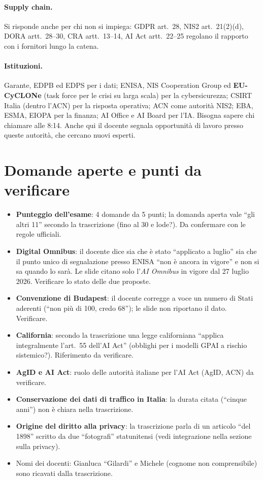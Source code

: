 \paragraph{Supply chain.} Si risponde anche per chi non si impiega: GDPR art.~28, NIS2
art.~21(2)(d), DORA artt.~28--30, CRA artt.~13--14, AI Act artt.~22--25 regolano il rapporto con i
fornitori lungo la catena.

\paragraph{Istituzioni.} Garante, EDPB ed EDPS per i dati; ENISA, NIS Cooperation Group ed
\textbf{EU-CyCLONe} (task force per le crisi su larga scala) per la cybersicurezza; CSIRT Italia
(dentro l'ACN) per la risposta operativa; ACN come autorità NIS2; EBA, ESMA, EIOPA per la finanza; AI
Office e AI Board per l'IA. Bisogna sapere chi chiamare alle 8:14. Anche qui il docente segnala
opportunità di lavoro presso queste autorità, che cercano nuovi esperti.

\section{Domande aperte e punti da verificare}
\begin{verifica}
\begin{itemize}
  \item \textbf{Punteggio dell'esame}: 4 domande da 5 punti; la domanda aperta vale ``gli altri 11''
    secondo la trascrizione (fino al 30 e lode?). Da confermare con le regole ufficiali.
  \item \textbf{Digital Omnibus}: il docente dice sia che è stato ``applicato a luglio'' sia che il
    punto unico di segnalazione presso ENISA ``non è ancora in vigore'' e non si sa quando lo sarà. Le
    slide citano solo l'\emph{AI Omnibus} in vigore dal 27 luglio 2026. Verificare lo stato delle due
    proposte.
  \item \textbf{Convenzione di Budapest}: il docente corregge a voce un numero di Stati aderenti
    (``non più di 100, credo 68''); le slide non riportano il dato. Verificare.
  \item \textbf{California}: secondo la trascrizione una legge californiana ``applica integralmente
    l'art.~55 dell'AI Act'' (obblighi per i modelli GPAI a rischio sistemico?). Riferimento da
    verificare.
  \item \textbf{AgID e AI Act}: ruolo delle autorità italiane per l'AI Act (AgID, ACN) da verificare.
  \item \textbf{Conservazione dei dati di traffico in Italia}: la durata citata (``cinque anni'') non
    è chiara nella trascrizione.
  \item \textbf{Origine del diritto alla privacy}: la trascrizione parla di un articolo ``del 1898''
    scritto da due ``fotografi'' statunitensi (vedi integrazione nella sezione sulla privacy).
  \item Nomi dei docenti: Gianluca ``Gilardi'' e Michele (cognome non comprensibile) sono ricavati
    dalla trascrizione.
\end{itemize}
\end{verifica}
